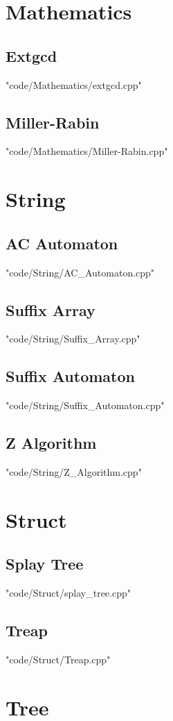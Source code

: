\documentclass [landscape,8pt,a4paper,twocolumn]{article}
\begin{document}
\section{Mathematics}
\subsection{Extgcd}
 {"code/Mathematics/extgcd.cpp"}
\subsection{Miller-Rabin}
 {"code/Mathematics/Miller-Rabin.cpp"}
\section{String}
\subsection{AC Automaton}
 {"code/String/AC_Automaton.cpp"}
\subsection{Suffix Array}
 {"code/String/Suffix_Array.cpp"}
\subsection{Suffix Automaton}
 {"code/String/Suffix_Automaton.cpp"}
\subsection{Z Algorithm}
 {"code/String/Z_Algorithm.cpp"}
\section{Struct}
\subsection{Splay Tree}
 {"code/Struct/splay_tree.cpp"}
\subsection{Treap}
 {"code/Struct/Treap.cpp"}
\section{Tree}
\end{document}

